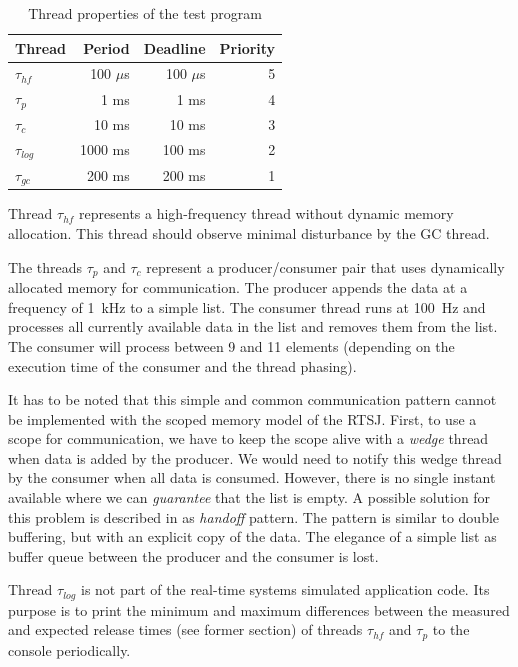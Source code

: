 \begin{table}
    \centering
    \begin{tabular}{lrrr}
    \toprule
    Thread & Period & Deadline & Priority \\
    \midrule
    $\tau_{hf}$ & 100 $\mu$s & 100 $\mu$s & 5 \\
    $\tau_{p}$ &  1 ms & 1 ms & 4 \\
    $\tau_{c}$ & 10 ms & 10 ms & 3 \\
    $\tau_{log}$ & 1000 ms & 100 ms & 2 \\
    $\tau_{gc}$ & 200 ms & 200 ms & 1 \\
    \bottomrule
    \end{tabular}
    \caption{Thread properties of the test program}
    \label{tab:exp}
\end{table}

Thread $\tau_{hf}$ represents a high-frequency thread without
dynamic memory allocation. This thread should observe minimal
disturbance by the GC thread.

The threads $\tau_{p}$ and $\tau_{c}$ represent a producer/consumer
pair that uses dynamically allocated memory for communication. The
producer appends the data at a frequency of 1~kHz to a simple list.
The consumer thread runs at 100~Hz and processes all currently
available data in the list and removes them from the list. The
consumer will process between 9 and 11 elements (depending on the
execution time of the consumer and the thread phasing).

It has to be noted that this simple and common communication pattern
cannot be implemented with the scoped memory model of the RTSJ.
First, to use a scope for communication, we have to keep the scope
alive with a \emph{wedge} thread \cite{conf/isorc/PizloFHV04} when
data is added by the producer. We would need to notify this wedge
thread by the consumer when all data is consumed. However, there is
no single instant available where we can \emph{guarantee} that the
list is empty. A possible solution for this problem is described in
\cite{conf/isorc/PizloFHV04} as \emph{handoff} pattern. The pattern
is similar to double buffering, but with an explicit copy of the
data. The elegance of a simple list as buffer queue between the
producer and the consumer is lost.

Thread $\tau_{log}$ is not part of the real-time systems simulated
application code. Its purpose is to print the minimum and maximum
differences between the measured and expected release times (see
former section) of threads $\tau_{hf}$ and $\tau_{p}$ to the console
periodically.

